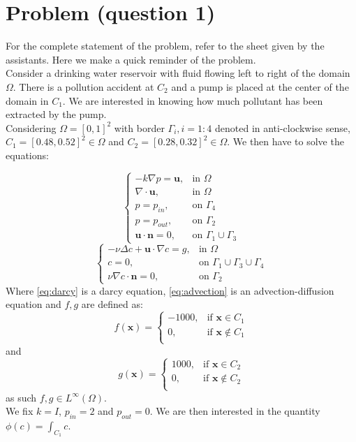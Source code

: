 \documentclass[conference]{IEEEtran}
\begin{document}
\section{Problem (question 1)}
For the complete statement of the problem, refer to the sheet given by the assistants. Here we make a quick reminder of the problem.\\
Consider a drinking water reservoir with fluid flowing left to right of the domain $\Omega$. There is a pollution accident at $C_2$ and a pump is placed at the center of the domain in $C_1$. We are interested in knowing how much pollutant has been extracted by the pump. \\
Considering $\Omega = [0,1]^2$ with border $\Gamma_i , i=1:4$ denoted in anti-clockwise sense, $C_1 = [0.48,0.52]^2 \in \Omega$ and $C_2=[0.28,0.32]^2 \in \Omega$. We then have to solve the equations:

\begin{equation}
    \begin{cases}
      -k \nabla p = \textbf{u} , & \text{in $\Omega$}  \\
      \nabla \cdot \textbf{u}, & \text{in $\Omega$} \\
      p=p_{in} , & \text{on $\Gamma_4$} \\
      p=p_{out} , & \text{on $\Gamma_2$} \\
      \textbf{u} \cdot \textbf{n} = 0, & \text{on } \Gamma_1 \cup \Gamma_3
    \end{cases}
    \label{eq:darcy}
\end{equation}
\begin{equation}
    \begin{cases}
      -\nu \Delta c + \textbf{u} \cdot \nabla c = g ,& \text{in $\Omega$}  \\
      c = 0, & \text{on } \Gamma_1 \cup \Gamma_3 \cup \Gamma_4 \\
      \nu \nabla c \cdot \textbf{n} = 0, & \text{on } \Gamma_2
    \end{cases}
    \label{eq:advection}
\end{equation}
Where \ref{eq:darcy} is a darcy equation, \ref{eq:advection} is an advection-diffusion equation and $f,g$ are defined as:
\begin{equation}
	f(\textbf{x})=
    \begin{cases}
      -1000,   & \text{if } \textbf{x} \in C_1 \\
      0,       & \text{if } \textbf{x} \notin C_1 \\
    \end{cases}
\end{equation}
and
\begin{equation}
	g(\textbf{x})=
    \begin{cases}
      1000, & \text{if } \textbf{x} \in C_2 \\
      0,    & \text{if } \textbf{x} \notin C_2 \\
    \end{cases}
\end{equation}
as such $f,g \in L^{\infty}(\Omega)$.\\
We fix $k=I$, $p_{in} = 2$ and $p_{out} = 0$. We are then interested in the quantity $\phi(c) = \int_{C_1} c$.
\end{document}
